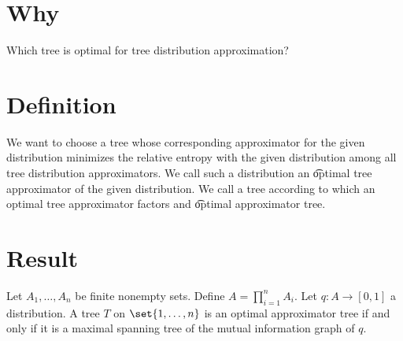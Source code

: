 
\section*{Why}

Which tree is optimal for tree distribution approximation?

\section*{Definition}

We want to choose a tree whose corresponding approximator for the given distribution minimizes the relative entropy with the given distribution among all tree distribution approximators.
We call such a distribution an \t{optimal} tree approximator of the given distribution.
We call a tree according to which an optimal tree approximator factors and \t{optimal} approximator tree.

\section*{Result}

\begin{proposition}

\label{prop:optimaltreeapproximators}Let $A_1, \dots , A_n$ be finite nonempty sets.
Define $A = \prod_{i = 1}^{n} A_i$.
Let $q: A \to [0, 1]$ a distribution.
A tree $T$ on $\set{1, \dots , n}$ is an optimal approximator tree if and only if it is a maximal spanning tree of the mutual information graph of $q$.

\end{proposition}


